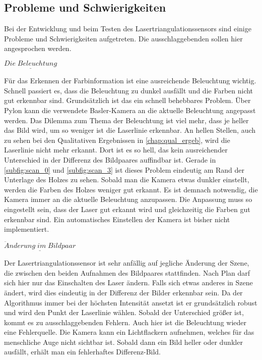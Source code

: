 		\subsection{Probleme und Schwierigkeiten}\label{chap:probleme_schwierigkeiten}
		Bei der Entwicklung und beim Testen des Lasertriangulationssensors sind einige Probleme und Schwierigkeiten aufgetreten. Die ausschlaggebenden sollen hier angesprochen werden.
		
		$\underline{Die \; Beleuchtung}$
		
		Für das Erkennen der Farbinformation ist eine ausreichende Beleuchtung wichtig. Schnell passiert es, dass die Beleuchtung zu dunkel ausfällt und die Farben nicht gut erkennbar sind. Grundsätzlich ist das ein schnell behebbares Problem. Über Pylon kann die verwendete Basler-Kamera an die aktuelle Beleuchtung angepasst werden. Das Dilemma zum Thema der Beleuchtung ist viel mehr, dass je heller das Bild wird, um so weniger ist die Laserlinie erkennbar. An hellen Stellen, auch zu sehen bei den Qualitativen Ergebnissen in \ref{chap:qual_ergeb}, wird die Laserlinie nicht mehr erkannt. Dort ist es so hell, das kein ausreichender Unterschied in der Differenz des Bildpaares auffindbar ist. Gerade in \ref{subfig:scan_0} und \ref{subfig:scan_3} ist dieses Problem eindeutig am Rand der Unterlage des Holzes zu sehen. Sobald man die Kamera etwas dunkler einstellt, werden die Farben des Holzes weniger gut erkannt. Es ist demnach notwendig, die Kamera immer an die aktuelle Beleuchtung anzupassen. Die Anpassung muss so eingestellt sein, dass der Laser gut erkannt wird und gleichzeitig die Farben gut erkennbar sind. Ein automatisches Einstellen der Kamera ist bisher nicht implementiert.
		
		$\underline{\ddot{A}nderung \; im \; Bildpaar}$
		
		Der Lasertriangulationssensor ist sehr anfällig auf jegliche Änderung der Szene, die zwischen den beiden Aufnahmen des Bildpaares stattfinden. Nach Plan darf sich hier nur das Einschalten des Laser ändern. Falls sich etwas anderes in Szene ändert, wird dies eindeutig in der Differenz der Bilder erkennbar sein. Da der Algorithmus immer bei der höchsten Intensität ansetzt ist er grundsätzlich robust und wird den Punkt der Laserlinie wählen. Sobald der Unterschied größer ist, kommt es zu ausschlaggebenden Fehlern. Auch hier ist die Beleuchtung wieder eine Fehlerquelle. Die Kamera kann ein Lichtflackern aufnehmen, welches für das menschliche Auge nicht sichtbar ist. Sobald dann ein Bild heller oder dunkler ausfällt, erhält man ein fehlerhaftes Differenz-Bild.
		
